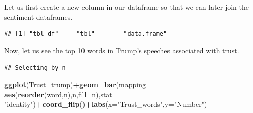 \documentclass[]{article}
\newenvironment{Shaded}{\begin{snugshade}}{\end{snugshade}}
\newcommand{\KeywordTok}[1]{\textcolor[rgb]{0.13,0.29,0.53}{\textbf{#1}}}
\newcommand{\DataTypeTok}[1]{\textcolor[rgb]{0.13,0.29,0.53}{#1}}
\newcommand{\DecValTok}[1]{\textcolor[rgb]{0.00,0.00,0.81}{#1}}
\newcommand{\StringTok}[1]{\textcolor[rgb]{0.31,0.60,0.02}{#1}}
\newcommand{\OperatorTok}[1]{\textcolor[rgb]{0.81,0.36,0.00}{\textbf{#1}}}
\newcommand{\NormalTok}[1]{#1}
\begin{document}
Let us first create a new column in our dataframe so that we can later
join the sentiment dataframes.

\begin{Shaded}
\end{Shaded}

\begin{verbatim}
## [1] "tbl_df"     "tbl"        "data.frame"
\end{verbatim}

Now, let us see the top 10 words in Trump's speeches associated with
trust.

\begin{Shaded}
\end{Shaded}

\begin{verbatim}
## Selecting by n
\end{verbatim}

\begin{Shaded}
\begin{Highlighting}[]
\KeywordTok{ggplot}\NormalTok{(Trust_trump)}\OperatorTok{+}\KeywordTok{geom_bar}\NormalTok{(}\DataTypeTok{mapping =} \KeywordTok{aes}\NormalTok{(}\KeywordTok{reorder}\NormalTok{(word,n),n,}\DataTypeTok{fill=}\NormalTok{n),}\DataTypeTok{stat =} \StringTok{"identity"}\NormalTok{)}\OperatorTok{+}\KeywordTok{coord_flip}\NormalTok{()}\OperatorTok{+}\KeywordTok{labs}\NormalTok{(}\DataTypeTok{x=}\StringTok{"Trust_words"}\NormalTok{,}\DataTypeTok{y=}\StringTok{"Number"}\NormalTok{)}
\end{Highlighting}
\end{Shaded}
\end{document}
